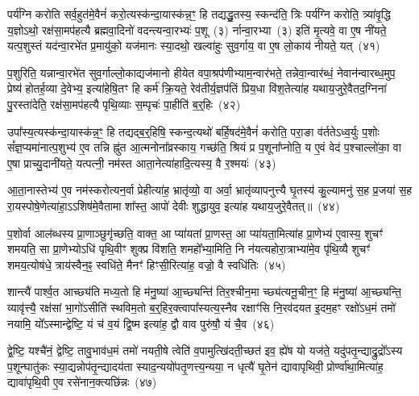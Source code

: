 {\anuvakamend[{आ॒घा॒रं प॑द्यन्ते॒ द्वाद॑शा॒त्मन्ने॒व य॒ज्ञस्य॒ मेध्य॑मे॒व खलु॒ वा अ॒ष्टाद॑श च}]}%

पर्य॑ग्नि करोति सर्व॒हुत॑मे॒वैनं॑ करो॒त्यस्क॑न्दा॒यास्क॑न्न॒ꣳ॒ हि तद्यद्धु॒तस्य॒ स्कन्द॑ति॒ त्रिः पर्य॑ग्नि करोति॒ त्र्या॑वृ॒द्धि य॒ज्ञो\-ऽथो॒ रक्ष॑सा॒मप॑हत्यै ब्रह्मवा॒दिनो॑ वदन्त्यन्वा॒रभ्यः॑ प॒शू~(३) र्नान्वा॒रभ्या~(३) इति॑ मृ॒त्यवे॒ वा ए॒ष नी॑यते॒ यत्प॒शुस्तं यद॑न्वा॒रभे॑त प्र॒मायु॑को॒ यज॑मानः स्या॒दथो॒ खल्वा॑हुः सुव॒र्गाय॒ वा ए॒ष लो॒काय॑ नीयते॒ यत्~(४१)

प॒शुरिति॒ यन्नान्वा॒रभे॑त सुव॒र्गाल्लो॒काद्यज॑मानो हीयेत वपा॒श्रप॑णीभ्याम॒न्वार॑भते॒ तन्नेवा॒न्वार॑ब्धं॒ नेवान॑न्वारब्ध॒मुप॒ प्रेष्य॑ होतर्\mbox{}ह॒व्या दे॒वेभ्य॒ इत्या॑हेषि॒तꣳ हि कर्म॑ क्रि॒यते॒ रेव॑तीर्य॒ज्ञप॑तिं प्रिय॒धा वि॑श॒तेत्या॑ह यथाय॒जुरे॒वैतद॒ग्निना॑ पु॒रस्ता॑देति॒ रक्ष॑सा॒मप॑हत्यै पृथि॒व्याः स॒म्पृचः॑ पा॒हीति॑ ब॒र्॒\mbox{}हिः~(४२)

उपा᳚स्य॒त्यस्क॑न्दा॒यास्क॑न्न॒ꣳ॒ हि तद्यद्ब॒र्॒\mbox{}हिषि॒ स्कन्द॒त्यथो॑ बर्\mbox{}हि॒षद॑मे॒वैनं॑ करोति॒ परा॒ङा व॑र्तते\-ऽध्व॒र्युः प॒शोः सं᳚ज्ञ॒प्यमा॑नात्प॒शुभ्य॑ ए॒व तन्नि ह्नु॑त आ॒त्मनोना᳚व्रस्काय॒ गच्छ॑ति॒ श्रियं प्र प॒शूना᳚प्नोति॒ य ए॒वं वेद॑ प॒श्चाल्लो॑का॒ वा ए॒षा प्राच्यु॒दानी॑यते॒ यत्पत्नी॒ नम॑स्त आता॒नेत्या॑हादि॒त्यस्य॒ वै र॒श्मयः॑~(४३)

आ॒ता॒नास्तेभ्य॑ ए॒व नम॑स्करोत्यन॒र्वा प्रेहीत्या॑ह॒ भ्रातृ॑व्यो॒ वा अर्वा॒ भ्रातृ॑व्यापनुत्त्यै घृ॒तस्य॑ कु॒ल्यामनु॑ स॒ह प्र॒जया॑ स॒ह रा॒यस्पोषे॒णेत्या॑हा॒\-ऽऽ\-शिष॑मे॒वैतामा शा᳚स्त॒ आपो॑ देवीः शुद्धायुव॒ इत्या॑ह यथाय॒जुरे॒वैतत्॥~(४४)

{\anuvakamend[{लो॒काय॑ नीयते॒ यद्ब॒र्॒\mbox{}ही र॒श्मयः॑ स॒प्तत्रिꣳ॑शच्च}]}%

प॒शोर्वा आल॑ब्धस्य प्रा॒णाञ्छुगृ॑च्छति॒ वाक्त॒ आ प्या॑यतां प्रा॒णस्त॒ आ प्या॑यता॒मित्या॑ह प्रा॒णेभ्य॑ ए॒वास्य॒ शुचꣳ॑ शमयति॒ सा प्रा॒णेभ्यो\-ऽधि॑ पृथि॒वीꣳ शुक्प्र वि॑शति॒ शमहो᳚भ्या॒मिति॒ नि न॑यत्यहोरा॒त्राभ्या॑मे॒व पृ॑थि॒व्यै शुचꣳ॑ शमय॒त्योष॑धे॒ त्राय॑स्वैन॒ꣴ॒ स्वधि॑ते॒ मैनꣳ॑ हिꣳसी॒रित्या॑ह॒ वज्रो॒ वै स्वधि॑तिः~(४५)

शान्त्यै॑ पार्श्व॒त आच्छ्य॑ति मध्य॒तो हि म॑नु॒ष्या॑ आ॒च्छ्यन्ति॑ तिर॒श्चीन॒मा च्छ्य॑त्यनू॒चीन॒ꣳ॒ हि म॑नु॒ष्या॑ आ॒च्छ्यन्ति॒ व्यावृ॑त्त्यै॒ रक्ष॑सां भा॒गो॑\-ऽसीति॑ स्थविम॒तो ब॒र्॒\mbox{}हिर॒क्त्वापा᳚स्यत्य॒स्नैव रक्षाꣳ॑सि नि॒रव॑दयत इ॒दम॒हꣳ रक्षो॑\-ऽध॒मं तमो॑ नयामि॒ यो᳚\-ऽस्मान्द्वेष्टि॒ यं च॑ व॒यं द्वि॒ष्म इत्या॑ह॒ द्वौ वाव पुरु॑षौ॒ यं चै॒व~(४६)

द्वे॒ष्टि॒ यश्चै॑नं॒ द्वेष्टि॒ तावु॒भाव॑ध॒मं तमो॑ नयती॒षे त्वेति॑ व॒पामुत्खि॑दती॒च्छत॑ इव॒ ह्ये॑ष यो यज॑ते॒ यदु॑पतृ॒न्द्याद्रु॒द्रो᳚\-ऽस्य प॒शून्घातु॑कः स्या॒द्यन्नोप॑तृ॒न्द्यादय॑ता स्याद॒न्ययो॑पतृ॒णत्त्य॒न्यया॒ न धृत्यै॑ घृ॒तेन॑ द्यावा\-पृथिवी॒ प्रोर्ण्वा॑था॒मित्या॑ह॒ द्यावा॑पृथि॒वी ए॒व रसे॑नान॒क्त्यछि॑न्नः~(४७)

